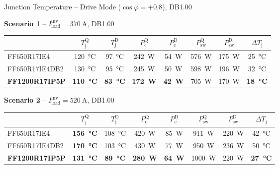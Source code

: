 \documentclass[aspectratio=169, 10pt]{beamer}
\newcommand{\good}[1]{\textcolor{goodgreen}{\textbf{#1}}}
\newcommand{\warn}[1]{\textcolor{warnred}{\textbf{#1}}}
\begin{document}
\begin{frame}{Junction Temperature -- Drive Mode ($\cos\varphi = +0.8$), DB1.00}
  \small
  \renewcommand{\arraystretch}{1.45}

  \textbf{Scenario 1} -- $I_\text{load}^\text{inv} = \SI{370}{\ampere}$, DB1.00
  \begin{center}
  \begin{tabular}{l c c c c c c c}
    \toprule
    & $T_\text{j}^\text{Q}$ & $T_\text{j}^\text{D}$ & $P_\text{c}^\text{Q}$ & $P_\text{c}^\text{D}$ & $P_\text{sw}^\text{Q}$ & $P_\text{sw}^\text{D}$ & $\Delta T_\text{j}$ \\
    \midrule
    \rowcolor{rowgray}
    FF650R17IE4    & \SI{120}{\celsius} & \SI{97}{\celsius}  & \SI{242}{W} & \SI{54}{W}  & \SI{576}{W}  & \SI{175}{W} & \SI{25}{\celsius} \\
    FF650R17IE4DB2 & \SI{130}{\celsius} & \SI{95}{\celsius}  & \SI{245}{W} & \SI{50}{W}  & \SI{598}{W}  & \SI{196}{W} & \SI{32}{\celsius} \\
    \rowcolor{rowgray}
    \textbf{FF1200R17IP5P} & \good{\SI{110}{\celsius}} & \good{\SI{83}{\celsius}}  & \good{\SI{172}{W}} & \good{\SI{42}{W}}  & \SI{705}{W}  & \SI{170}{W} & \good{\SI{18}{\celsius}} \\
    \bottomrule
  \end{tabular}
  \end{center}

  \vspace{4pt}
  \textbf{Scenario 2} -- $I_\text{load}^\text{inv} = \SI{520}{\ampere}$, DB1.00
  \begin{center}
  \begin{tabular}{l c c c c c c c}
    \toprule
    & $T_\text{j}^\text{Q}$ & $T_\text{j}^\text{D}$ & $P_\text{c}^\text{Q}$ & $P_\text{c}^\text{D}$ & $P_\text{sw}^\text{Q}$ & $P_\text{sw}^\text{D}$ & $\Delta T_\text{j}$ \\
    \midrule
    \rowcolor{rowgray}
    FF650R17IE4    & \warn{\SI{156}{\celsius}} & \SI{108}{\celsius} & \SI{420}{W} & \SI{85}{W}  & \SI{911}{W}  & \SI{220}{W} & \SI{42}{\celsius} \\
    FF650R17IE4DB2 & \warn{\SI{170}{\celsius}} & \SI{103}{\celsius} & \SI{430}{W} & \SI{77}{W}  & \SI{950}{W}  & \SI{236}{W} & \SI{50}{\celsius} \\
    \rowcolor{rowgray}
    \textbf{FF1200R17IP5P} & \good{\SI{131}{\celsius}} & \good{\SI{89}{\celsius}}  & \good{\SI{280}{W}} & \good{\SI{64}{W}}  & \SI{1000}{W} & \SI{220}{W} & \good{\SI{27}{\celsius}} \\
    \bottomrule
  \end{tabular}
  \end{center}
\end{frame}
\end{document}
